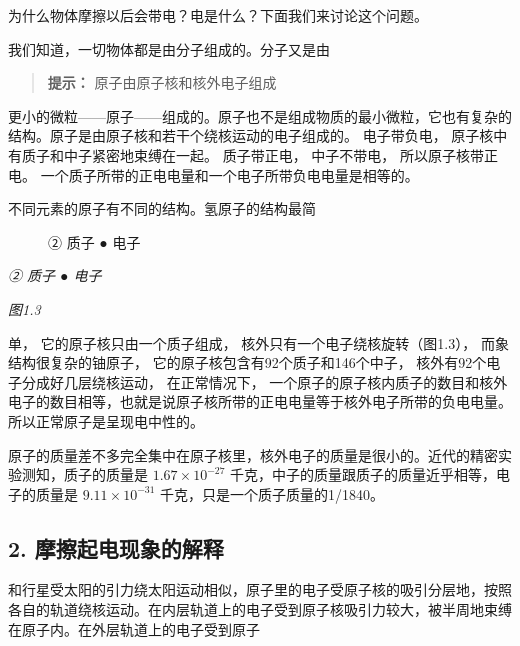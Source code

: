 为什么物体摩擦以后会带电？电是什么？下面我们来讨论这个问题。

我们知道，一切物体都是由分子组成的。分子又是由

\begin{quote}
\textbf{提示：} 原子由原子核和核外电子组成
\end{quote}

更小的微粒------原子------组成的。原子也不是组成物质的最小微粒，它也有复杂的结构。原子是由原子核和若干个绕核运动的电子组成的。
电子带负电， 原子核中有质子和中子紧密地束缚在一起。 质子带正电，
中子不带电， 所以原子核带正电。
一个质子所带的正电电量和一个电子所带负电电量是相等的。

不同元素的原子有不同的结构。氢原子的结构最简

\begin{figure}
\centering
{}
\caption{② 质子 ● 电子}
\end{figure}

\emph{② 质子 ● 电子}

\emph{图1.3}

单， 它的原子核只由一个质子组成， 核外只有一个电子绕核旋转（图1.3），
而象结构很复杂的铀原子， 它的原子核包含有92个质子和146个中子，
核外有92个电子分成好几层绕核运动， 在正常情况下，
一个原子的原子核内质子的数目和核外电子的数目相等，也就是说原子核所带的正电电量等于核外电子所带的负电电量。所以正常原子是呈现电中性的。

原子的质量差不多完全集中在原子核里，核外电子的质量是很小的。近代的精密实验测知，质子的质量是
\(1.67 \times 10^{-27}\)
千克，中子的质量跟质子的质量近乎相等，电子的质量是
\(9.11 \times 10^{-31}\) 千克，只是一个质子质量的1/1840。

\subsection{2.
摩擦起电现象的解释}\label{ux6469ux64e6ux8d77ux7535ux73b0ux8c61ux7684ux89e3ux91ca}

和行星受太阳的引力绕太阳运动相似，原子里的电子受原子核的吸引分层地，按照各自的轨道绕核运动。在内层轨道上的电子受到原子核吸引力较大，被半周地束缚在原子内。在外层轨道上的电子受到原子

